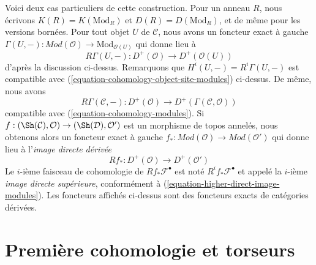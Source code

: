 \medskip\noindent
Voici deux cas particuliers de cette construction. Pour un anneau $R$, nous écrivons
$K(R) = K(\text{Mod}_R)$ et $D(R) = D(\text{Mod}_R)$, et de même pour les
versions bornées. Pour tout objet $U$ de $\mathcal{C}$, nous avons un foncteur exact à gauche
$
\Gamma(U, -) :
\textit{Mod}(\mathcal{O})
\longrightarrow
\text{Mod}_{\mathcal{O}(U)}
$
qui donne lieu à
$$
R\Gamma(U, -) :
D^{+}(\mathcal{O})
\longrightarrow
D^{+}(\mathcal{O}(U))
$$
d'après la discussion ci-dessus. Remarquons que $H^i(U, -) = R^i\Gamma(U, -)$
est compatible avec (\ref{equation-cohomology-object-site-modules}) ci-dessus.
De même, nous avons
$$
R\Gamma(\mathcal{C}, -) :
D^{+}(\mathcal{O})
\longrightarrow
D^{+}(\Gamma(\mathcal{C}, \mathcal{O}))
$$
compatible avec (\ref{equation-cohomology-modules}). Si
$f : (\Sh(\mathcal{C}), \mathcal{O}) \to (\Sh(\mathcal{D}), \mathcal{O}')$
est un morphisme de topos annelés, nous obtenons alors un foncteur exact à gauche
$f_* : \textit{Mod}(\mathcal{O}) \to \textit{Mod}(\mathcal{O}')$
qui donne lieu à l'{\it image directe dérivée}
$$
Rf_* : D^{+}(\mathcal{O}) \to D^+(\mathcal{O}')
$$
Le $i$-ième faisceau de cohomologie de $Rf_*\mathcal{F}^\bullet$ est noté
$R^if_*\mathcal{F}^\bullet$ et appelé la $i$-ième {\it image directe supérieure},
conformément à (\ref{equation-higher-direct-image-modules}).
Les foncteurs affichés ci-dessus sont des foncteurs exacts
de catégories dérivées.







\section{Première cohomologie et torseurs}
\label{section-h1-torsors}


